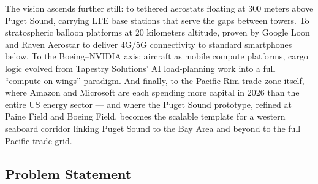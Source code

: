 \documentclass[11pt,letterpaper]{article}
\begin{document}
The vision ascends further still: to tethered aerostats floating at 300 meters above Puget Sound, carrying LTE base stations that serve the gaps between towers. To stratospheric balloon platforms at 20 kilometers altitude, proven by Google Loon and Raven Aerostar to deliver 4G/5G connectivity to standard smartphones below. To the Boeing--NVIDIA axis: aircraft as mobile compute platforms, cargo logic evolved from Tapestry Solutions' AI load-planning work into a full ``compute on wings'' paradigm. And finally, to the Pacific Rim trade zone itself, where Amazon and Microsoft are each spending more capital in 2026 than the entire US energy sector --- and where the Puget Sound prototype, refined at Paine Field and Boeing Field, becomes the scalable template for a western seaboard corridor linking Puget Sound to the Bay Area and beyond to the full Pacific trade grid.

\subsection{Problem Statement}
\end{document}
